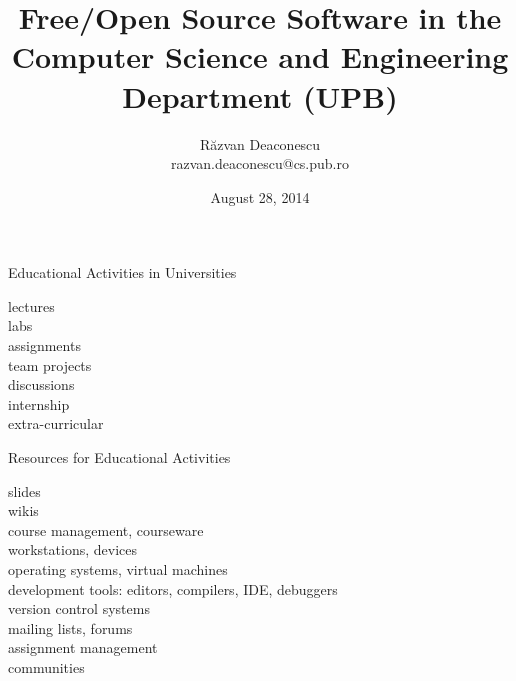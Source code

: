 \documentclass{simple}
\title[FOSS @CSE]{Free/Open Source Software in the Computer Science and
Engineering Department (UPB)}
\date{August 28, 2014}
\author[Răzvan Deaconescu]{Răzvan Deaconescu\\
razvan.deaconescu@cs.pub.ro}
\begin{document}
\frame{\titlepage}

\begin{frame}{Educational Activities in Universities}
  \begin{center}
    {\Large
      \pause lectures \\
      \pause labs \\
      \pause assignments \\
      \pause team projects \\
      \pause discussions \\
      \pause internship \\
      \pause extra-curricular
    }
  \end{center}
\end{frame}

\begin{frame}{Resources for Educational Activities}
  \begin{center}
    {\Large
      \pause slides \\
      \pause wikis \\
      \pause course management, courseware \\
      \pause workstations, devices \\
      \pause operating systems, virtual machines \\
      \pause development tools: editors, compilers, IDE, debuggers \\
      \pause version control systems \\
      \pause mailing lists, forums \\
      \pause assignment management \\
      \pause communities
    }
  \end{center}
\end{frame}
\end{document}
